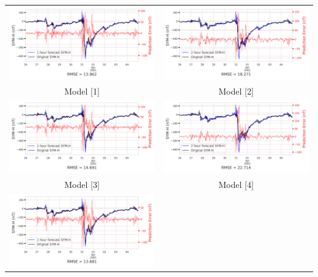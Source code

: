 \documentclass[draft,sw]{agutexSI2019}
\begin{document}
\begin{table}
\centering
\begin{tabular}{cc}
\includegraphics[width=0.49\linewidth]{paper_plots/1h_swics/1h_swics_storm_33.png}
&
\includegraphics[width=0.49\linewidth]{paper_plots/2h_swics/2h_swics_storm_33.png}
\\
Model [1] & Model [2]
\vspace*{12pt}
\\
\includegraphics[width=0.49\linewidth]{paper_plots/1h_no_swics/1h_no_swics_storm_33.png}
&
\includegraphics[width=0.49\linewidth]{paper_plots/2h_no_swics/2h_no_swics_storm_33.png}
\\
Model [3] & Model [4]
\vspace*{12pt}
\\
\includegraphics[width=0.49\linewidth]{paper_plots/1h_swics_model_on_no_swics/1h_swics_model_on_no_swics_storm_33.png}

\end{tabular}
\end{table}
\end{document}
